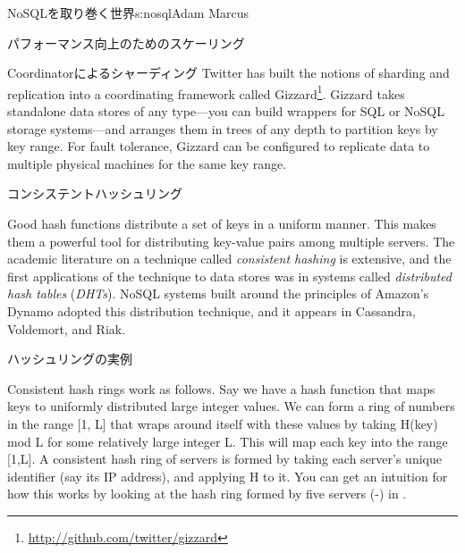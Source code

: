 \begin{aosachapter}{NoSQLを取り巻く世界}{s:nosql}{Adam Marcus}
\begin{aosasect1}{パフォーマンス向上のためのスケーリング}
\begin{aosasect2}{Coordinatorによるシャーディング}
Twitter has built the notions of sharding and replication into a
coordinating framework called Gizzard\footnote{\url{http://github.com/twitter/gizzard}}.  Gizzard takes standalone data stores of any
type---you can build wrappers for SQL or NoSQL storage systems---and
arranges them in trees of any depth to partition keys by key range.
For fault tolerance, Gizzard can be configured to replicate data to
multiple physical machines for the same key range.

\end{aosasect2}

\begin{aosasect2}{コンシステントハッシュリング}

Good hash functions distribute a set of keys in a uniform manner.
This makes them a powerful tool for distributing key-value pairs
among multiple servers.  The academic literature on a technique
called \emph{consistent hashing} is extensive, and the first
applications of the technique to data stores was in systems called
\emph{distributed hash tables} (\emph{DHTs}).  NoSQL systems built
around the principles of Amazon's Dynamo adopted this distribution
technique, and it appears in Cassandra, Voldemort, and Riak.

\begin{aosasect3}{ハッシュリングの実例}


Consistent hash rings work as follows.  Say we have a hash function
 that maps keys to uniformly distributed large integer values.  We
can form a ring of numbers in the range [1, L] that wraps around
itself with these values by taking H(key) mod L for some relatively
large integer L\@.  This will map each key into the range [1,L].  A
consistent hash ring of servers is formed by taking each server's
unique identifier (say its IP address), and applying H to it.  You can
get an intuition for how this works by looking at the hash ring formed
by five servers (-) in .


\end{aosasect3}
\end{aosasect2}
\end{aosasect1}
\end{aosachapter}
